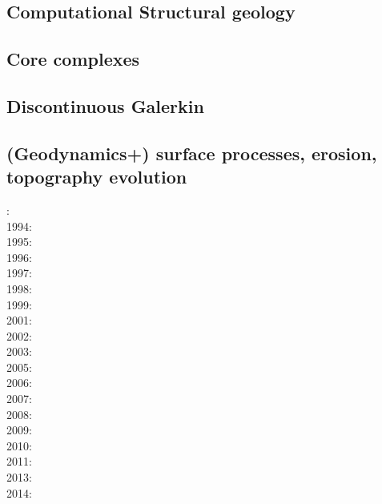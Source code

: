 \subsection*{Computational Structural geology}

\cite{acgf00}
\cite{trla00}

\subsection*{Core complexes}

\cite{lehm12}

\subsection*{Discontinuous Galerkin}

\cite{kauf12}\cite{ngpc10}\cite{coks09}\cite{fewk17}\cite{kans08}\cite{geor11}
\cite{cogo09}\cite{cacp02}\cite{cacs05}\cite{coks05}\cite{coks02}\cite{coks00}
\cite{mofh08}\cite{iglo17}\cite{ngpe12}\cite{puth18}\cite{hepb17}\cite{ngpc11}
\cite{conp10}\cite{mofp10}\cite{lelk15} 

\subsection*{(Geodynamics+) surface processes, erosion, topography evolution}

: \cite{befh92}\\
1994: \cite{howa94}\cite{koon94}\cite{kobe94}\\
1995: \cite{chmm95}\cite{koon95}\\
1996: \cite{avbu96}\\
1997: \cite{brsa97}\\
1998: \cite{deea98}\\
1999: \cite{will99a}\cite{bupi99}\cite{babr99}\\
2001: \cite{zemk01}\cite{tulg01}\cite{brsh01}\cite{bupo01}\cite{coul01}\cite{crda01}\\
2002: \cite{wibr02}\\
2003: \cite{brau03}\\
2005: \cite{lave05}\cite{will05}\\
2006: \cite{rosw06}\cite{brau06gsl}\\
2007: \cite{buto07}\\
2008: \cite{alle08}\cite{rowf08}\\
2009: \cite{whip09}\cite{kuhe09}\\
2010: \cite{will10}\cite{tuha10}\cite{brau10b}\cite{brau10}\cite{brya10}\cite{cmwt10}\\
2011: \cite{robr11}\\
2013: \cite{vehc13}\cite{brwi13}\\
2014: \cite{crbr14}\cite{cokm14}

